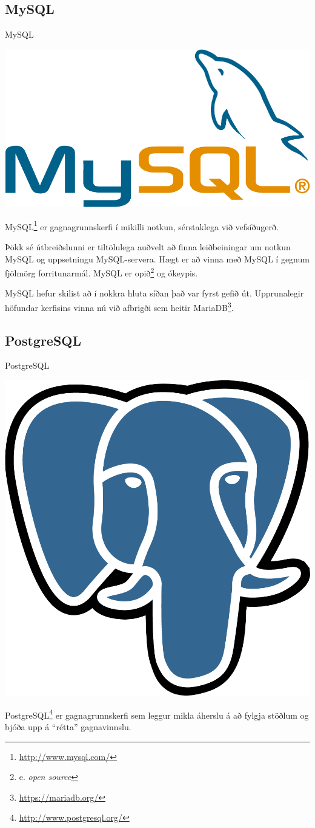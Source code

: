 \subsection{MySQL}
\label{undirkafli:mysql}
\begin{marginfigure}
\caption{MySQL}
\label{mynd:mysql}
\centering
\includegraphics[width=\linewidth]{myndir/mysql}
\end{marginfigure}
MySQL\footnote{\url{http://www.mysql.com/}} er gagnagrunnskerfi í mikilli notkun, sérstaklega við vefsíðugerð.

Þökk sé útbreiðslunni er tiltölulega auðvelt að finna leiðbeiningar um notkun MySQL og uppsetningu MySQL-servera. Hægt er að vinna með MySQL í gegnum fjölmörg forritunarmál. MySQL er opið\footnote{e. \emph{open source}} og ókeypis.

MySQL hefur skilist að í nokkra hluta síðan það var fyrst gefið út. Upprunalegir höfundar kerfisins vinna nú við afbrigði sem heitir MariaDB\footnote{\url{https://mariadb.org/}}.
\subsection{PostgreSQL}
\begin{marginfigure}
\caption{PostgreSQL}
\label{mynd:postgresql}
\centering
\includegraphics[width=0.8\linewidth]{myndir/postgresql}
\end{marginfigure}
PostgreSQL\footnote{\url{http://www.postgresql.org/}} er gagnagrunnskerfi sem leggur mikla áherslu á að fylgja stöðlum og bjóða upp á ``rétta'' gagnavinnslu.


